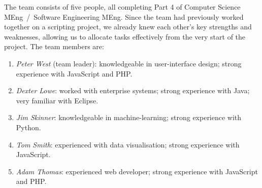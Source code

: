 The team consists of five people, all completing Part 4 of Computer Science MEng~/~Software Engineering MEng. Since the team had previously worked together on a scripting project, we already knew each other's key strengths and weaknesses, allowing us to allocate tasks effectively from the very start of the project. The team members are:
\begin{enumerate}
\item \textit{Peter West} (team leader): knowledgeable in user-interface design; strong experience with JavaScript and PHP.
\item \textit{Dexter Lowe}: worked with enterprise systems; strong experience with Java; very familiar with Eclipse.
\item \textit{Jim Skinner}: knowledgeable in machine-learning; strong experience with Python.
\item \textit{Tom Smith}: experienced with data visualisation; strong experience with JavaScript.
\item \textit{Adam Thomas}: experienced web developer; strong experience with JavaScript and PHP.
\end{enumerate}


